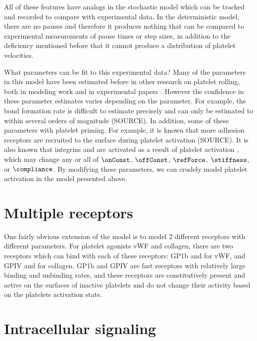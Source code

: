 All of these features have analogs in the stochastic model which can
be tracked and recorded to compare with experimental data. In the
deterministic model, there are no pauses and therefore it produces
nothing that can be compared to experimental measurements of pause
times or step sizes, in addition to the deficiency mentioned before
that it cannot produce a distribution of platelet velocities.

What parameters can be fit to this experimental data? Many of the
parameters in this model have been estimated before in other research
on platelet rolling, both in modeling work \cite{Fitzgibbon2014,
  Mody2008b, Wang2013} and in experimental papers \cite{Litvinov2011,
  Litvinov2012}. However the confidence in these parameter estimates
varies depending on the parameter. For example, the bond formation
rate is difficult to estimate precisely and can only be estimated to
within several orders of magnitude (SOURCE). In addition, some of
these parameters with platelet priming. For example, it is known that
more adhesion receptors are recruited to the surface during platelet
activation (SOURCE). It is also known that integrins 
and  are activated as a result of platelet activation
\cite{Kee2015}, which may change any or all of $\onConst$, $\offConst$,
$\refForce$, $\stiffness$, or $\compliance$. By modifying these
parameters, we can crudely model platelet activation in the model
presented above.

\section{Multiple receptors}
\label{sec:multiple-receptors}

One fairly obvious extension of the model is to model 2 different
receptors with different parameters. For platelet agonists vWF and
collagen, there are two receptors which can bind with each of these
receptors: GP1b and  for vWF, and GPIV and
 for collagen. GP1b and GPIV are fast receptors with
relatively large binding and unbinding rates, and these receptors are
constitutively present and active on the surfaces of inactive
platelets and do not change their activity based on the platelets
activation state. 

\section{Intracellular signaling}
\label{sec:intr-sign}


